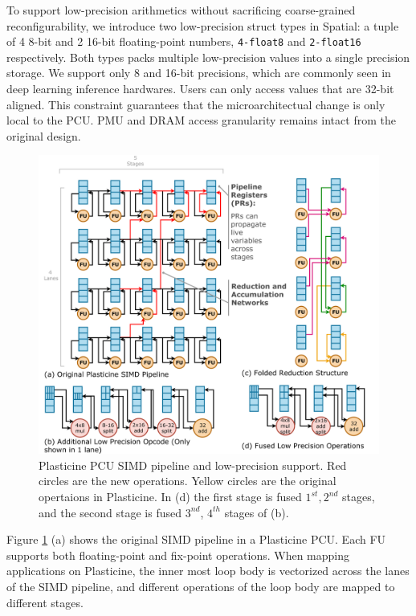 To support low-precision arithmetics without sacrificing coarse-grained reconfigurability,
we introduce two low-precision struct types in Spatial: a tuple of 4 8-bit and 2 16-bit floating-point 
numbers, \texttt{4-float8} and \texttt{2-float16} respectively.
Both types packs multiple low-precision values into a single precision storage.
We support only 8 and 16-bit precisions, which are commonly seen in deep learning inference hardwares.
Users can only access values that are 32-bit aligned.
This constraint guarantees that the microarchitectual change is only local to the PCU.
PMU and DRAM access granularity remains intact from the original design.

\begin{figure}
  \centering
  \includegraphics[width=1\columnwidth]{figs/lowprec.pdf}
  \caption{Plasticine PCU SIMD pipeline and low-precision support.
  Red circles are the new operations. Yellow circles are the original opertaions in Plasticine.
  In (d) the first stage is fused $1^{st}, 2^{nd}$ stages, and the second stage is fused
  $3^{nd}$, $4^{th}$ stages of (b).
   }
  \label{fig:lowprec}
\end{figure}
Figure \ref{fig:lowprec} (a) shows the original SIMD pipeline in a Plasticine PCU.
Each FU supports both floating-point and fix-point operations.
When mapping applications on Plasticine,
  the inner most loop body is vectorized across the lanes of the
SIMD pipeline, and different operations of the loop body are mapped to different stages.
